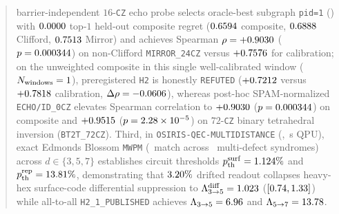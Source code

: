 \documentclass[aps,prx,twocolumn,superscriptaddress,nofootinbib]{revtex4-2}
\begin{document}
\begin{abstract}
barrier-independent $16$-\texttt{CZ} echo probe selects oracle-best subgraph \texttt{pid=1} (\remEchoTopOneQubits) with $\remEchoTopOneRegret$ top-$1$ held-out composite regret ($\remEchoPidOneComposite$ composite, $\remEchoPidOneClifford$ Clifford, $\remEchoPidOneMirror$ Mirror) and achieves Spearman $\rho = +\remEchoMirrorRho$ ($p = \remEchoMirrorPEcho$) on non-Clifford \texttt{MIRROR\_24CZ} versus $+\remEchoMirrorCalRho$ for calibration; on the unweighted composite in this single well-calibrated window ($N_{\mathrm{windows}} = \remEchoWindowsN$), preregistered \texttt{H2} is honestly \texttt{REFUTED} ($+\remEchoCompRho$ versus $+\remEchoCompCalRho$ calibration, $\Delta\rho = \remEchoCompDeltaRho$), whereas post-hoc SPAM-normalized \texttt{ECHO/ID\_0CZ} elevates Spearman correlation to $+\remEchoNormCompRho$ ($p = \remEchoNormCompP$) on composite and $+\remEchoNormBtRho$ ($p = \remEchoNormBtPSci$) on $72$-\texttt{CZ} binary tetrahedral inversion (\texttt{BT2T\_72CZ}). Third, in \texttt{OSIRIS-QEC-MULTIDISTANCE} (\remSimTier, \remSimQpuSec\,s QPU), exact Edmonds Blossom \texttt{MWPM} (\remMultiBlossomMatchPct\ match across \remMultiBlossomSyndromes\ multi-defect syndromes) across $d \in \{3, 5, 7\}$ establishes circuit thresholds $p_{\mathrm{th}}^{\mathrm{surf}} = \remMultiSurfPthPct$ and $p_{\mathrm{th}}^{\mathrm{rep}} = \remMultiRepPthPct$, demonstrating that $\remDrfRoPct$ drifted readout collapses heavy-hex surface-code differential suppression to $\Lambda_{3\to 5}^{\mathrm{diff}} = \remMultiDrfSurfDiffLamThreeFive$ ($[\remMultiDrfSurfDiffCiLo, \remMultiDrfSurfDiffCiHi]$) while all-to-all \texttt{H2\_1\_PUBLISHED} achieves $\Lambda_{3\to 5} = \remMultiHtwoSurfLamThreeFive$ and $\Lambda_{5\to 7} = \remMultiHtwoSurfLamFiveSeven$.
\end{abstract}

\maketitle
\end{document}

